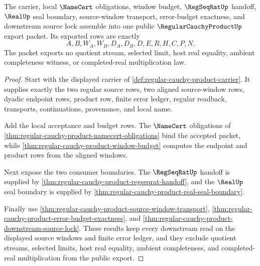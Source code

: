 \begin{theorem}
\label{thm:regular-cauchy-product-public-export-certificate}
The carrier, local $\NameCert$ obligations, window budget, $\RegSeqRatUp$ handoff, $\RealUp$ seal boundary, source-window transport, error-budget exactness, and downstream source lock assemble into one public $\RegularCauchyProductUp$ export packet. Its exported rows are exactly
$$
A,B,W_A,W_B,D_A,D_B,D,E,R,H,C,P,N.
$$
The packet exports no quotient stream, selected limit, host real equality, ambient completeness witness, or completed-real multiplication law.
\end{theorem}
\begin{proof}
Start with the displayed carrier of \autoref{def:regular-cauchy-product-carrier}. It supplies exactly the two regular source rows, two aligned source-window rows, dyadic endpoint rows, product row, finite error ledger, regular readback, transports, continuations, provenance, and local name.

Add the local acceptance and budget rows. The $\NameCert$ obligations of \autoref{thm:regular-cauchy-product-namecert-obligations} bind the accepted packet, while \autoref{thm:regular-cauchy-product-window-budget} computes the endpoint and product rows from the aligned windows.

Next expose the two consumer boundaries. The $\RegSeqRatUp$ handoff is supplied by \autoref{thm:regular-cauchy-product-regseqrat-handoff}, and the $\RealUp$ seal boundary is supplied by \autoref{thm:regular-cauchy-product-real-seal-boundary}.

Finally use \autoref{thm:regular-cauchy-product-source-window-transport}, \autoref{thm:regular-cauchy-product-error-budget-exactness}, and \autoref{thm:regular-cauchy-product-downstream-source-lock}. These results keep every downstream read on the displayed source windows and finite error ledger, and they exclude quotient streams, selected limits, host real equality, ambient completeness, and completed-real multiplication from the public export.
\end{proof}

